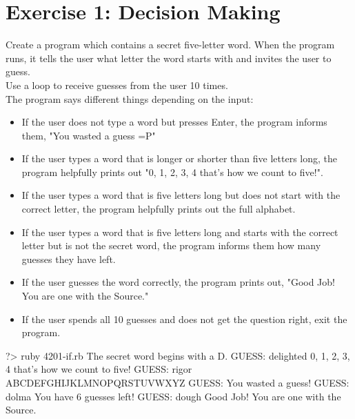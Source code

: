 \documentclass{42-en}
\begin{document}

\chapter{Exercise 1: Decision Making}

\exnumber{\exercicenumber}
\makeheaderfiles

Create a program which contains a secret five-letter word.
When the program runs, it tells the user what letter the word starts with and invites the user to guess.\\

Use a loop to receive guesses from the user 10 times.\\

The program says different things depending on the input:
\begin{itemize}
\item If the user does not type a word but presses Enter, the program informs them, "You wasted a guess =P"
\item If the user types a word that is longer or shorter than five letters long, the program helpfully prints out "0, 1, 2, 3, 4 that's how we count to five!". 
\item If the user types a word that is five letters long but does not start with the correct letter, the program helpfully prints out the full alphabet.
\item If the user types a word that is five letters long and starts with the correct letter but is not the secret word, the program informs them how many guesses they have left.
\item If the user guesses the word correctly, the program prints out, "Good Job! You are one with the Source."
\item If the user spends all 10 guesses and does not get the question right, exit the program.
\end{itemize}
\begin{42console}
	?> ruby 4201-if.rb
	The secret word begins with a D.
	GUESS: delighted
	0, 1, 2, 3, 4 that's how we count to five!
	GUESS: rigor
	ABCDEFGHIJKLMNOPQRSTUVWXYZ
	GUESS:
	You wasted a guess!
	GUESS: dolma
	You have 6 guesses left!
	GUESS: dough
	Good Job! You are one with the Source.
\end{42console}
\end{document}
